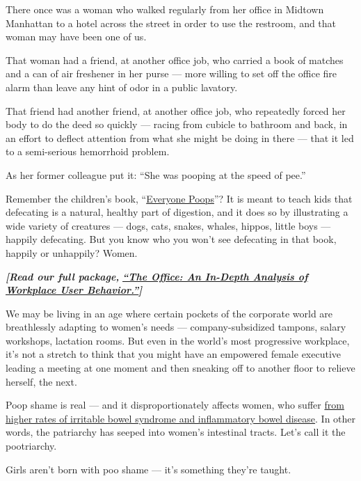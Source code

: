 There once was a woman who walked regularly from her office in Midtown
Manhattan to a hotel across the street in order to use the restroom, and
that woman may have been one of us.

That woman had a friend, at another office job, who carried a book of
matches and a can of air freshener in her purse --- more willing to set
off the office fire alarm than leave any hint of odor in a public
lavatory.

That friend had another friend, at another office job, who repeatedly
forced her body to do the deed so quickly --- racing from cubicle to
bathroom and back, in an effort to deflect attention from what she might
be doing in there --- that it led to a semi-serious hemorrhoid problem.

As her former colleague put it: ``She was pooping at the speed of pee.''

Remember the children's book,
``\href{https://www.amazon.com/Everyone-Turtleback-School-Library-Binding/dp/0613685725/ref=sr_1_1?keywords=everybody+poops\&qid=1568487804\&s=books\&sr=1-1}{Everyone
Poops}''? It is meant to teach kids that defecating is a natural,
healthy part of digestion, and it does so by illustrating a wide variety
of creatures --- dogs, cats, snakes, whales, hippos, little boys ---
happily defecating. But you know who you won't see defecating in that
book, happily or unhappily? Women.

\emph{\textbf{{[}Read our full package,}}
\textbf{\href{https://www.nytimes.com/interactive/2019/09/17/style/the-office.html}{\emph{``The
Office: An In-Depth Analysis of Workplace User Behavior.''}}\emph{{]}}}

We may be living in an age where certain pockets of the corporate world
are breathlessly adapting to women's needs --- company-subsidized
tampons, salary workshops, lactation rooms. But even in the world's most
progressive workplace, it's not a stretch to think that you might have
an empowered female executive leading a meeting at one moment and then
sneaking off to another floor to relieve herself, the next.

Poop shame is real --- and it disproportionately affects women, who
suffer \href{https://gi.org/topics/common-gi-problems-in-women/}{from
higher rates of irritable bowel syndrome and inflammatory bowel
disease}. In other words, the patriarchy has seeped into women's
intestinal tracts. Let's call it the pootriarchy.

Girls aren't born with poo shame --- it's something they're taught.

